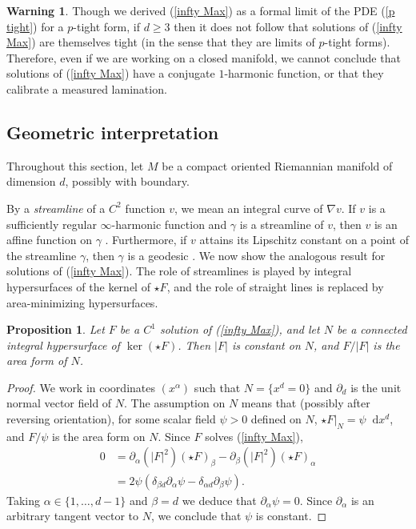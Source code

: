 \documentclass[reqno,11pt]{amsart}
\newcommand*\dif{\mathop{}\!\mathrm{d}}
\newcommand{\dfn}[1]{\emph{#1}\index{#1}}
\newtheorem{proposition}[theorem]{Proposition}
\theoremstyle{definition}
\newtheorem{warning}[theorem]{Warning}
\numberwithin{equation}{section}
\begin{document}
\begin{warning}
Though we derived (\ref{infty Max}) as a formal limit of the PDE (\ref{p tight}) for a $p$-tight form, if $d \geq 3$ then it does not follow that solutions of (\ref{infty Max}) are themselves tight (in the sense that they are limits of $p$-tight forms).
Therefore, even if we are working on a closed manifold, we cannot conclude that solutions of (\ref{infty Max}) have a conjugate $1$-harmonic function, or that they calibrate a measured lamination.
\end{warning}

\subsection{Geometric interpretation}\label{EL interpretation}
Throughout this section, let $M$ be a compact oriented Riemannian manifold of dimension $d$, possibly with boundary.

By a \dfn{streamline} of a $C^2$ function $v$, we mean an integral curve of $\nabla v$.
If $v$ is a sufficiently regular $\infty$-harmonic function and $\gamma$ is a streamline of $v$, then $v$ is an affine function on $\gamma$ \cite[\S3]{Aronsson67}.
Furthermore, if $v$ attains its Lipschitz constant on a point of the streamline $\gamma$, then $\gamma$ is a geodesic \cite[Theorem 5.2]{daskalopoulos2020transverse}.
We now show the analogous result for solutions of (\ref{infty Max}).
The role of streamlines is played by integral hypersurfaces of the kernel of $\star F$, and the role of straight lines is replaced by area-minimizing hypersurfaces.

\begin{proposition}
Let $F$ be a $C^1$ solution of (\ref{infty Max}), and let $N$ be a connected integral hypersurface of $\ker(\star F)$.
Then $|F|$ is constant on $N$, and $F/|F|$ is the area form of $N$.
\end{proposition}
\begin{proof}
We work in coordinates $(x^\alpha)$ such that $N = \{x^d = 0\}$ and $\partial_d$ is the unit normal vector field of $N$.
The assumption on $N$ means that (possibly after reversing orientation), for some scalar field $\psi > 0$ defined on $N$, $\star F|_N = \psi \dif x^d$, and $F/\psi$ is the area form on $N$.
Since $F$ solves (\ref{infty Max}),
\begin{align*}
0 
&= \partial_\alpha(|F|^2)(\star F)_\beta - \partial_\beta(|F|^2)(\star F)_\alpha \\
&= 2\psi(\delta_{\beta d} \partial_\alpha \psi - \delta_{\alpha d} \partial_\beta \psi).
\end{align*}
Taking $\alpha \in \{1, \dots, d - 1\}$ and $\beta = d$ we deduce that $\partial_\alpha \psi = 0$.
Since $\partial_\alpha$ is an arbitrary tangent vector to $N$, we conclude that $\psi$ is constant.
\end{proof}
\end{document}
